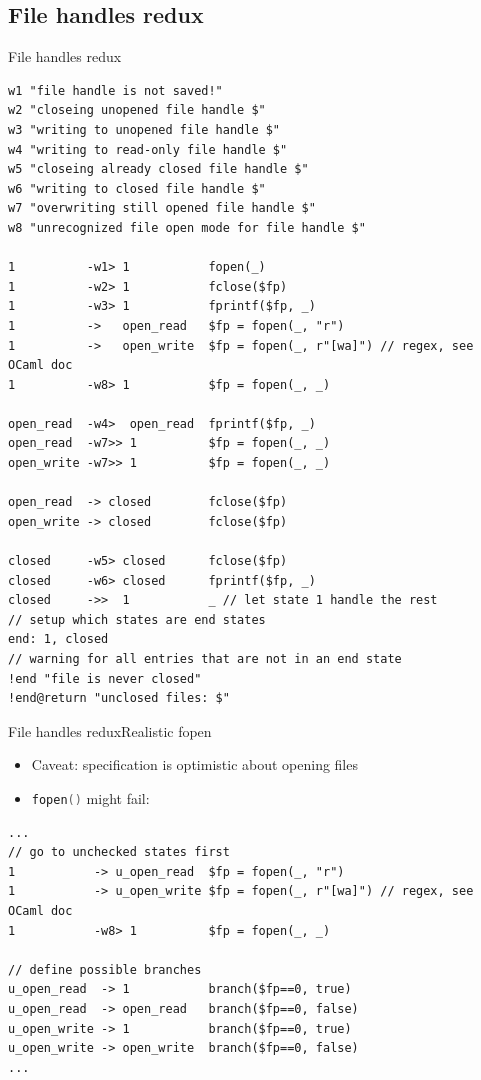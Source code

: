 \documentclass{beamer}
\newcommand{\inlineC}[1]{\lstinline[language=C]$#1$}
\begin{document}
\subsection{File handles redux}

\begin{frame}[fragile]{File handles redux}
\begin{lstlisting}[basicstyle=\tiny\ttfamily,]
w1 "file handle is not saved!"
w2 "closeing unopened file handle $"
w3 "writing to unopened file handle $"
w4 "writing to read-only file handle $"
w5 "closeing already closed file handle $"
w6 "writing to closed file handle $"
w7 "overwriting still opened file handle $"
w8 "unrecognized file open mode for file handle $"

1          -w1> 1           fopen(_)
1          -w2> 1           fclose($fp)
1          -w3> 1           fprintf($fp, _)
1          ->   open_read   $fp = fopen(_, "r")
1          ->   open_write  $fp = fopen(_, r"[wa]") // regex, see OCaml doc
1          -w8> 1           $fp = fopen(_, _)

open_read  -w4>  open_read  fprintf($fp, _)
open_read  -w7>> 1          $fp = fopen(_, _)
open_write -w7>> 1          $fp = fopen(_, _)

open_read  -> closed        fclose($fp)
open_write -> closed        fclose($fp)

closed     -w5> closed      fclose($fp)
closed     -w6> closed      fprintf($fp, _)
closed     ->>  1           _ // let state 1 handle the rest
// setup which states are end states
end: 1, closed
// warning for all entries that are not in an end state
!end "file is never closed"
!end@return "unclosed files: $"
\end{lstlisting}
\end{frame}

\begin{frame}[fragile]{File handles redux}{Realistic fopen}
\begin{itemize}
\item Caveat: specification is optimistic about opening files
\item \inlineC{fopen()} might fail:
\end{itemize}
\begin{lstlisting}[basicstyle=\scriptsize\ttfamily]
...
// go to unchecked states first
1           -> u_open_read  $fp = fopen(_, "r")
1           -> u_open_write $fp = fopen(_, r"[wa]") // regex, see OCaml doc
1           -w8> 1          $fp = fopen(_, _)

// define possible branches
u_open_read  -> 1           branch($fp==0, true)
u_open_read  -> open_read   branch($fp==0, false)
u_open_write -> 1           branch($fp==0, true)
u_open_write -> open_write  branch($fp==0, false)
...
\end{lstlisting}
\end{frame}
\end{document}
